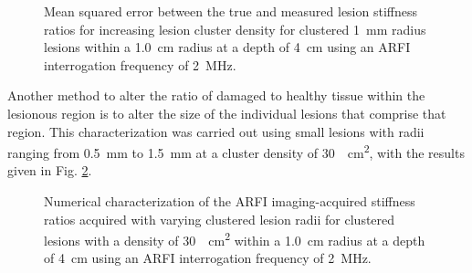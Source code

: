 			\begin{figure}[!htb]
				\centering
				\caption[ARFI imaging-acquired lesion stiffness mean squared error related to small lesion cluster density]{Mean squared error between the true and measured lesion stiffness ratios for increasing lesion cluster density for clustered \SI{1}{\mm} radius lesions within a \SI{1.0}{cm} radius at a depth of \SI{4}{\cm} using an ARFI interrogation frequency of \SI{2}{\MHz}.}
				\label{fig:arfi_cluster_density_mse}
			\end{figure}

			Another method to alter the ratio of damaged to healthy tissue within the lesionous region is to alter the size of the individual lesions that comprise that region. This characterization was carried out using small lesions with radii ranging from \SI{0.5}{\mm} to \SI{1.5}{\mm} at a cluster density of \SI{30}{\per\cm\squared}, with the results given in Fig. \ref{fig:arfi_cluster_radius}.

			\begin{figure}[!htb]
				\centering
				\caption[Numerical characterization of ARFI imaging-acquired stiffness ratio with clustered lesions]{Numerical characterization of the ARFI imaging-acquired stiffness ratios acquired with varying clustered lesion radii for clustered lesions with a density of \SI{30}{\per\cm\squared} within a \SI{1.0}{cm} radius at a depth of \SI{4}{\cm} using an ARFI interrogation frequency of \SI{2}{\MHz}.}
				\label{fig:arfi_cluster_radius}
			\end{figure}

